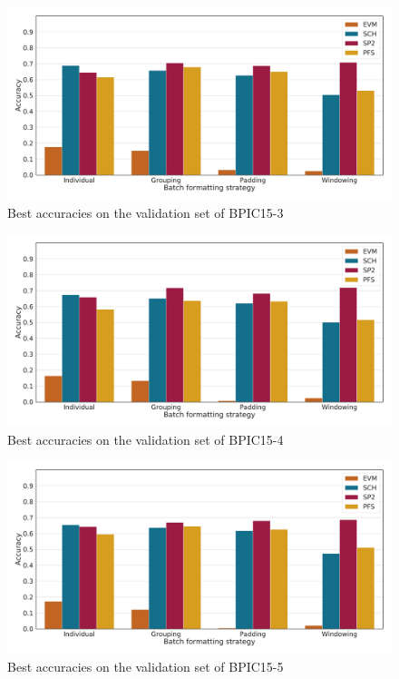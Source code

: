 \begin{figure}
    \centering
    \includegraphics[width=\textwidth]{gfx/bpic2015_3/accuracies.pdf}
    \caption{Best accuracies on the validation set of BPIC15-3}
    \label{fig:max-accuracies-bpic2015-3}
\end{figure}
\begin{figure}
    \centering
    \includegraphics[width=\textwidth]{gfx/bpic2015_4/accuracies.pdf}
    \caption{Best accuracies on the validation set of BPIC15-4}
    \label{fig:max-accuracies-bpic2015-4}
\end{figure}
\begin{figure}
    \centering
    \includegraphics[width=\textwidth]{gfx/bpic2015_5/accuracies.pdf}
    \caption{Best accuracies on the validation set of BPIC15-5}
    \label{fig:max-accuracies-bpic2015-5}
\end{figure}
\FloatBarrier
